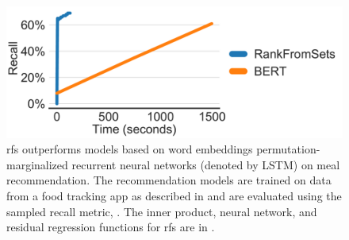\begin{figure}[!tb]
  \centering
  \includegraphics[width=0.95\linewidth]{fig/training-recall}
  \caption{\acrlong{rfs} outperforms models based on word embeddings
    permutation-marginalized recurrent neural networks (denoted by LSTM) on meal
    recommendation. The recommendation models are trained on data from a food
    tracking app as described in  and are evaluated
    using the sampled recall metric, . The inner
    product, neural network, and residual regression functions for \acrlong{rfs}
    are in .}
  \label{fig:training-recall}
\end{figure}